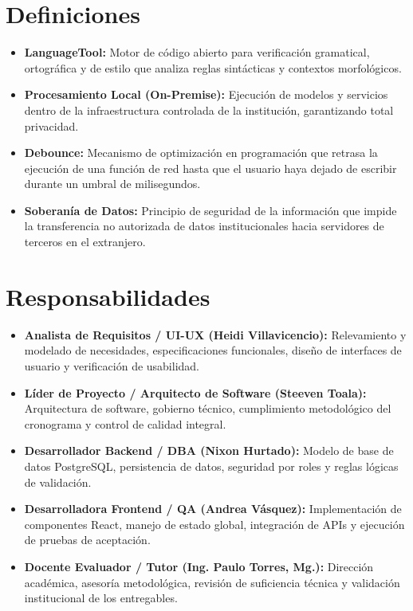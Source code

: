 \documentclass[12pt,a4paper]{article}
\begin{document}
\section{Definiciones}
\begin{itemize}[leftmargin=1.5em, itemsep=2pt]
    \item \textbf{LanguageTool:} Motor de código abierto para verificación gramatical, ortográfica y de estilo que analiza reglas sintácticas y contextos morfológicos.
    \item \textbf{Procesamiento Local (On-Premise):} Ejecución de modelos y servicios dentro de la infraestructura controlada de la institución, garantizando total privacidad.
    \item \textbf{Debounce:} Mecanismo de optimización en programación que retrasa la ejecución de una función de red hasta que el usuario haya dejado de escribir durante un umbral de milisegundos.
    \item \textbf{Soberanía de Datos:} Principio de seguridad de la información que impide la transferencia no autorizada de datos institucionales hacia servidores de terceros en el extranjero.
\end{itemize}

\section{Responsabilidades}
\begin{itemize}[leftmargin=1.5em, itemsep=2pt]
    \item \textbf{Analista de Requisitos / UI-UX (Heidi Villavicencio):} Relevamiento y modelado de necesidades, especificaciones funcionales, diseño de interfaces de usuario y verificación de usabilidad.
    \item \textbf{Líder de Proyecto / Arquitecto de Software (Steeven Toala):} Arquitectura de software, gobierno técnico, cumplimiento metodológico del cronograma y control de calidad integral.
    \item \textbf{Desarrollador Backend / DBA (Nixon Hurtado):} Modelo de base de datos PostgreSQL, persistencia de datos, seguridad por roles y reglas lógicas de validación.
    \item \textbf{Desarrolladora Frontend / QA (Andrea Vásquez):} Implementación de componentes React, manejo de estado global, integración de APIs y ejecución de pruebas de aceptación.
    \item \textbf{Docente Evaluador / Tutor (Ing. Paulo Torres, Mg.):} Dirección académica, asesoría metodológica, revisión de suficiencia técnica y validación institucional de los entregables.
\end{itemize}
\end{document}
